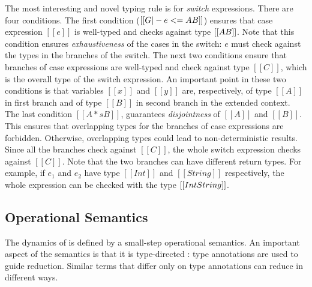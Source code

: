The most interesting and novel typing rule is for
\emph{switch} expressions. There are four conditions.
The first condition ($[[G |-
    e <= A \/ B]]$) ensures that case expression $[[e]]$ is well-typed
and checks against type $[[A \/ B]]$. Note that this condition ensures
\emph{exhaustiveness} of the cases in the switch: $e$ must
check against the types in the branches of the switch.
The next two conditions ensure that
branches of case expressions are well-typed and check against type
$[[C]]$, which is the overall type of the switch expression.
An important point in these two conditions is that variables
$[[x]]$ and $[[y]]$ are, respectively, of type $[[A]]$ in first branch and of type $[[B]]$ in
second branch in the extended context.
The last condition
$[[A *s B]]$, guarantees \emph{disjointness} of $[[A]]$ and $[[B]]$.
This ensures that overlapping types for the branches of case expressions
are forbidden. Otherwise, overlapping types could lead to
non-deterministic results.
Since all the branches check against $[[C]]$, the whole
switch expression checks against $[[C]]$.
Note that the two branches can have different return types.
For example, if $e_1$ and $e_2$ have type $[[Int]]$ and $[[String]]$ respectively,
the whole expression can be checked with the type $[[Int \/ String]]$.

\begin{comment}
\begin{figure}[t]
  \begin{small}
    \centering
    \drules[typ]{$ [[G |- e dirflag A]] $}{Bi-directional Typing}{int, var, ann, app, sub, abs, typeof}
  \end{small}
  \caption{Typing for \cal.}
  \label{fig:union:typ}
\end{figure}
\end{comment}

\subsection{Operational Semantics}
\label{sec:union:os}
The dynamics of \cal is defined by a small-step operational semantics. An
important aspect of the semantics is that it is type-directed
\cite{Huang:typedirected}: type annotations are used to guide reduction.
Similar terms that differ only on type annotations can reduce in different
ways.

